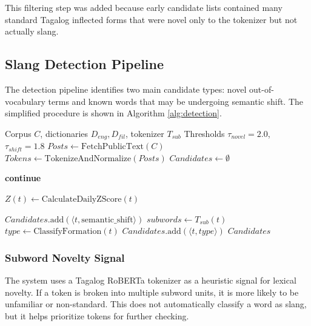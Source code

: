 This filtering step was added because early candidate lists contained many standard Tagalog inflected forms that were novel only to the tokenizer but not actually slang.

\subsection{Slang Detection Pipeline}
The detection pipeline identifies two main candidate types: novel out-of-vocabulary terms and known words that may be undergoing semantic shift. The simplified procedure is shown in Algorithm \ref{alg:detection}.

\begin{algorithm}[!t]
\caption{Slang Candidate Detection Pipeline}
\label{alg:detection}
\begin{algorithmic}[1]
\Require Corpus $C$, dictionaries $D_{eng}, D_{fil}$, tokenizer $T_{sub}$
\Require Thresholds $\tau_{novel}=2.0$, $\tau_{shift}=1.8$
\State $Posts \gets \text{FetchPublicText}(C)$
\State $Tokens \gets \text{TokenizeAndNormalize}(Posts)$
\State $Candidates \gets \emptyset$

        \State \textbf{continue}
    \EndIf

    \State $Z(t) \gets \text{CalculateDailyZScore}(t)$

            \State $Candidates.\text{add}(\langle t, \text{semantic\_shift} \rangle)$
        \EndIf
    \Else
        \State $subwords \gets T_{sub}(t)$
            \State $type \gets \text{ClassifyFormation}(t)$
            \State $Candidates.\text{add}(\langle t, type \rangle)$
        \EndIf
    \EndIf
\EndFor
\State \Return $Candidates$
\end{algorithmic}
\end{algorithm}

\subsubsection{Subword Novelty Signal}
The system uses a Tagalog RoBERTa tokenizer as a heuristic signal for lexical novelty. If a token is broken into multiple subword units, it is more likely to be unfamiliar or non-standard. This does not automatically classify a word as slang, but it helps prioritize tokens for further checking.

